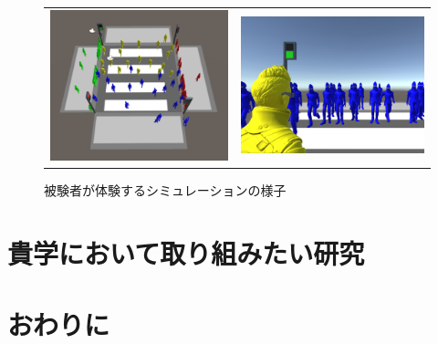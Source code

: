\documentclass[twocolumn]{jarticle}%
\begin{document}
\begin{figure}[H]
    \begin{tabular}{cc}
      \begin{minipage}[t]{0.45\hsize}
        \centering
        \includegraphics[keepaspectratio, scale=0.11]{images/environment.JPG}
        \caption{シミュレーション環境}
        \label{fig:environment}
      \end{minipage} &
      \begin{minipage}[t]{0.45\hsize}
        \centering
        \includegraphics[keepaspectratio, scale=0.1]{images/user_view_mini.JPG}
        \caption{被験者が体験するシミュレーションの様子}
        \label{fig:user_view}
      \end{minipage}
    \end{tabular}
  \end{figure}

\section{貴学において取り組みたい研究}\label{want}

\section{おわりに}



\end{document}
